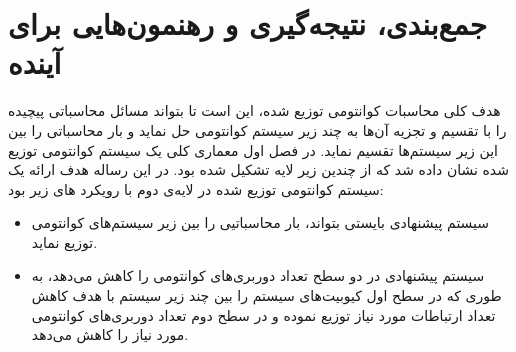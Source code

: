\chapter{جمع‌بندی، نتیجه‌گیری و رهنمون‌هایی برای آینده}
هدف کلی محاسبات کوانتومی توزیع شده، این است تا بتواند مسائل محاسباتی پیچیده را با تقسیم و تجزیه آن‌ها به چند زیر سیستم کوانتومی حل نماید و بار محاسباتی را بین این زیر سیستم‌ها تقسیم نماید. در فصل اول معماری کلی یک سیستم کوانتومی توزیع شده نشان داده شد که از چندین زیر لایه تشکیل شده بود. در این رساله هدف ارائه یک سیستم کوانتومی توزیع شده در لایه‌ی دوم با رویکرد های زیر بود:
\begin{itemize}
\item
سیستم پیشنهادی بایستی بتواند، بار محاسباتیی را بین زیر سیستم‌های کوانتومی توزیع نماید.
\item
سیستم پیشنهادی در دو سطح تعداد دوربری‌های کوانتومی را کاهش می‌دهد، به طوری که در سطح اول کیوبیت‌های سیستم را بین چند زیر سیستم با هدف کاهش تعداد ارتباطات مورد نیاز توزیع نموده و در سطح دوم تعداد دوربری‌های کوانتومی مورد نیاز را کاهش می‌دهد.
\end{itemize}

